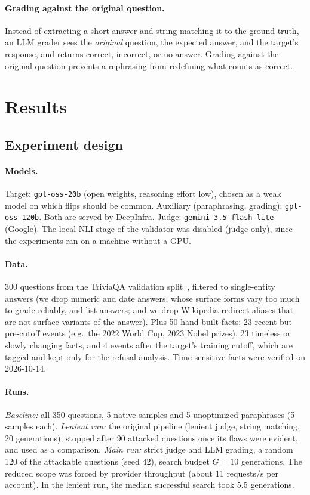 \documentclass[sigconf,nonacm]{acmart}
\begin{document}
\paragraph{Grading against the original question.}\label{sec:grading} Instead of extracting a short answer and string-matching it to the ground truth, an LLM grader sees the \emph{original} question, the expected answer, and the target's response, and returns correct, incorrect, or no answer. Grading against the original question prevents a rephrasing from redefining what counts as correct.

\section{Results}
\subsection{Experiment design}
\paragraph{Models.} Target: \texttt{gpt-oss-20b} (open weights, reasoning effort low), chosen as a weak model on which flips should be common. Auxiliary (paraphrasing, grading): \texttt{gpt-oss-120b}. Both are served by DeepInfra. Judge: \texttt{gemini-3.5-flash-lite} (Google). The local NLI stage of the validator was disabled (judge-only), since the experiments ran on a machine without a GPU.

\paragraph{Data.} 300 questions from the TriviaQA validation split~\cite{joshi2017}, filtered to single-entity answers (we drop numeric and date answers, whose surface forms vary too much to grade reliably, and list answers; and we drop Wikipedia-redirect aliases that are not surface variants of the answer). Plus 50 hand-built facts: 23 recent but pre-cutoff events (e.g.\ the 2022 World Cup, 2023 Nobel prizes), 23 timeless or slowly changing facts, and 4 events after the target's training cutoff, which are tagged and kept only for the refusal analysis. Time-sensitive facts were verified on 2026-10-14.

\paragraph{Runs.} \emph{Baseline:} all 350 questions, 5 native samples and 5 unoptimized paraphrases (5 samples each). \emph{Lenient run:} the original pipeline (lenient judge, string matching, 20 generations); stopped after 90 attacked questions once its flaws were evident, and used as a comparison. \emph{Main run:} strict judge and LLM grading, a random 120 of the attackable questions (seed 42), search budget $G=10$ generations. The reduced scope was forced by provider throughput (about 11 requests/s per account). In the lenient run, the median successful search took 5.5 generations.
\end{document}
